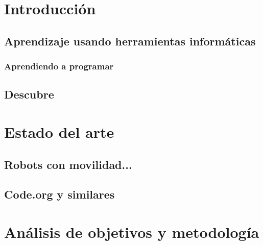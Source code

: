 


\chapter{Introducción}

\section{Aprendizaje usando herramientas informáticas}
\label{sec:Aprendizaje usando herramientas informáticas}

\subsection{Aprendiendo a programar}
\label{sub:Aprendiendo a programar}

\section{Descubre}


\chapter{Estado del arte}

\section{Robots con movilidad...}
\label{sec:Robots con movilidad...}

\section{Code.org y similares}
\label{sec:Code.org y similares}




\chapter{Análisis de objetivos y metodología}



